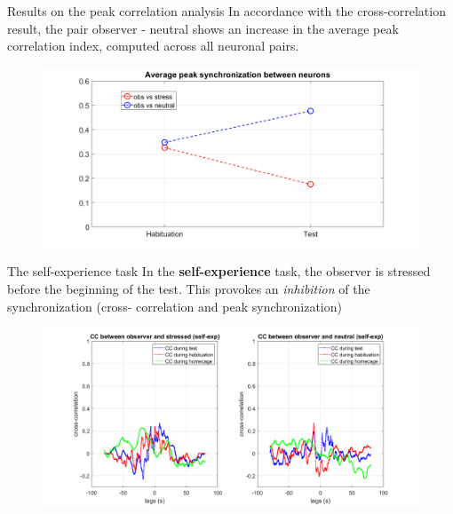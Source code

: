 \documentclass{beamer}
\begin{document}
\begin{frame}{Results on the peak correlation analysis}
In accordance with the cross-correlation result, the pair observer - neutral shows an increase in the average peak correlation index, computed across all neuronal pairs.

\begin{figure}[H]
	
	\centering
	\includegraphics[scale=0.3]{avg_pks}
	
\end{figure}

\end{frame}


\begin{frame}{The self-experience task}
In the \textbf{self-experience} task, the observer is stressed before the beginning of the test. This provokes an \textit{inhibition} of the synchronization (cross- correlation and peak synchronization)

\begin{figure}[H]
	
	\centering
	\includegraphics[scale=0.3]{average_cc_self}
	
\end{figure}
\end{frame}
\end{document}
